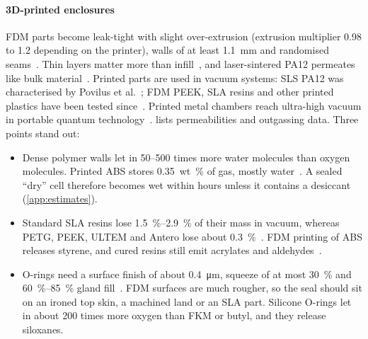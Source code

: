 \paragraph{3D-printed enclosures} FDM parts become leak-tight with slight over-extrusion (extrusion
multiplier 0.98 to 1.2 depending on the printer), walls of at least \SI{1.1}{mm} and randomised
seams~\cite{Gordeev2018}. Thin layers matter more than infill~\cite{Leeder2025}, and laser-sintered PA12
permeates like bulk material~\cite{Liebrich2021}. Printed parts are used in vacuum systems: SLS PA12 was
characterised by Povilus et al.~\cite{Povilus2014}; FDM PEEK, SLA resins and other printed plastics have
been tested since~\cite{Stallwood2018,Radic2025,Domingues2025}. Printed metal chambers reach ultra-high
vacuum in portable quantum technology~\cite{Cooper2021}.  lists permeabilities and
outgassing data. Three points stand out:
\begin{itemize}
  \item Dense polymer walls let in 50--500 times more water molecules than oxygen molecules. Printed ABS
        stores \SI{0.35}{wt\percent} of gas, mostly water~\cite{Sefa2016}. A sealed ``dry'' cell
        therefore becomes wet within hours unless it contains a desiccant (\cref{app:estimates}).
  \item Standard SLA resins lose \SIrange{1.5}{2.9}{\percent} of their mass in vacuum, whereas PETG,
        PEEK, ULTEM and Antero lose about \SI{0.3}{\percent}~\cite{NASAoutgassing}. FDM printing of
        ABS releases styrene, and cured resins still emit acrylates and
        aldehydes~\cite{Azimi2016,Wojnowski2022,Pham2023}.
  \item O-rings need a surface finish of about \SI{0.4}{\micro m}, squeeze of at most \SI{30}{\percent}
        and \SIrange{60}{85}{\percent} gland fill~\cite{ParkerORing}. FDM surfaces are much rougher,
        so the seal should sit on an ironed top skin, a machined land or an SLA part. Silicone O-rings
        let in about 200 times more oxygen than FKM or butyl, and they release siloxanes.
\end{itemize}

